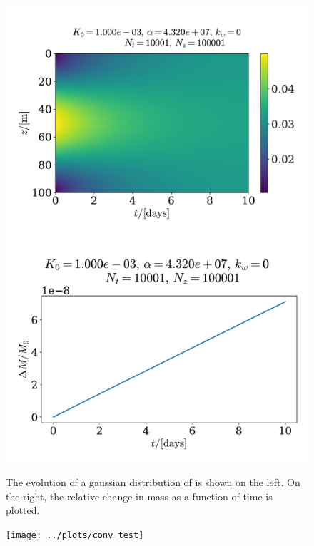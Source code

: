 \documentclass{article}
\begin{document}
    \begin{figure}
        \centering
        \includegraphics[width=.49\textwidth]{../plots/test2_c}
        \includegraphics[width=.49\textwidth]{../plots/test2_m}
        \label{Consv mass}
        \caption{The evolution of a gaussian distribution of  is shown on the left. On the right, the relative change in mass as a function of time is plotted. }
    \end{figure}


    \begin{figure}
        \centering
        \texttt{[image: ../plots/conv\_test]}
        \label{convergence test}
        \caption{}
    \end{figure}
    
    
\end{document}
